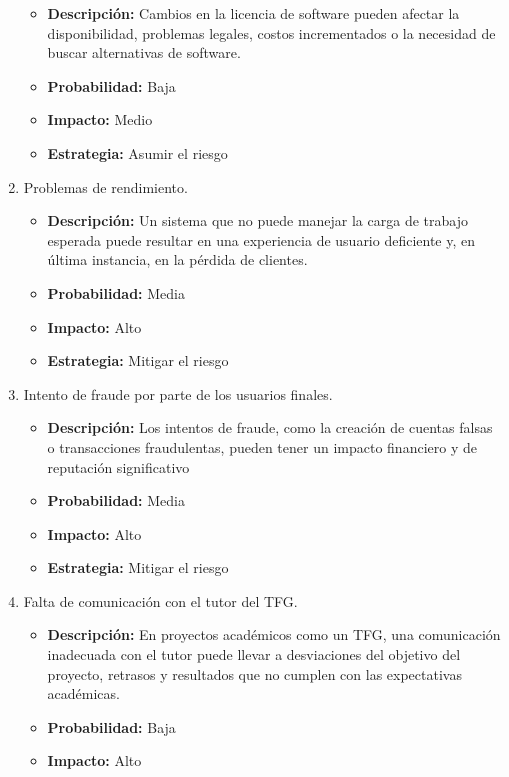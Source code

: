 \begin{enumerate}
    \begin{itemize}
        \item \textbf{Descripción:} Cambios en la licencia de software pueden afectar la disponibilidad, problemas legales, costos incrementados o la necesidad de buscar alternativas de software.
        \item \textbf{Probabilidad:} Baja
        \item \textbf{Impacto:} Medio
        \item \textbf{Estrategia:} Asumir el riesgo
    \end{itemize}
    \item Problemas de rendimiento.
    \begin{itemize}
        \item \textbf{Descripción:} Un sistema que no puede manejar la carga de trabajo esperada puede resultar en una experiencia de usuario deficiente y,
         en última instancia, en la pérdida de clientes.
        \item \textbf{Probabilidad:} Media
        \item \textbf{Impacto:} Alto
        \item \textbf{Estrategia:} Mitigar el riesgo
    \end{itemize}
    \item Intento de fraude por parte de los usuarios finales.
    \begin{itemize}
        \item \textbf{Descripción:} Los intentos de fraude, como la creación de cuentas falsas o transacciones fraudulentas, pueden tener un impacto financiero y de reputación significativo
        \item \textbf{Probabilidad:} Media
        \item \textbf{Impacto:} Alto
        \item \textbf{Estrategia:} Mitigar el riesgo
    \end{itemize}
    \item Falta de comunicación con el tutor del TFG.
    \begin{itemize}
        \item \textbf{Descripción:} En proyectos académicos como un TFG, una comunicación inadecuada con el tutor puede llevar a desviaciones del objetivo del proyecto, 
        retrasos y resultados que no cumplen con las expectativas académicas.
        \item \textbf{Probabilidad:} Baja
        \item \textbf{Impacto:} Alto

\end{itemize}
\end{enumerate}
